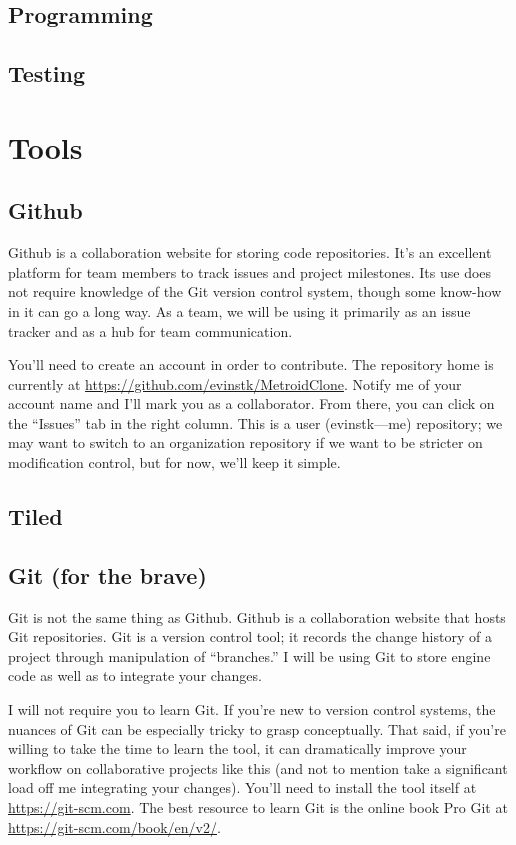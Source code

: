 \documentclass{article}
\begin{document}
\subsection*{Programming}

\subsection*{Testing}

\section{Tools}

\subsection*{Github}
Github is a collaboration website for storing code repositories. It's an excellent platform for team members to track issues and project milestones. Its use does not require knowledge of the Git version control system, though some know-how in it can go a long way. As a team, we will be using it primarily as an issue tracker and as a hub for team communication.

You'll need to create an account in order to contribute. The repository home is currently at \url{https://github.com/evinstk/MetroidClone}. Notify me of your account name and I'll mark you as a collaborator. From there, you can click on the ``Issues'' tab in the right column. This is a user (evinstk---me) repository; we may want to switch to an organization repository if we want to be stricter on modification control, but for now, we'll keep it simple.

\subsection*{Tiled}

\subsection*{Git (for the brave)}
Git is not the same thing as Github. Github is a collaboration website that hosts Git repositories. Git is a version control tool; it records the change history of a project through manipulation of ``branches.'' I will be using Git to store engine code as well as to integrate your changes.

I will not require you to learn Git. If you're new to version control systems, the nuances of Git can be especially tricky to grasp conceptually. That said, if you're willing to take the time to learn the tool, it can dramatically improve your workflow on collaborative projects like this (and not to mention take a significant load off me integrating your changes). You'll need to install the tool itself at \url{https://git-scm.com}. The best resource to learn Git is the online book Pro Git at \url{https://git-scm.com/book/en/v2/}.
\end{document}
